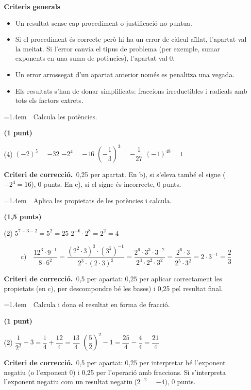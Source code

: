 \documentclass[11pt,a4paper]{article}
\newcounter{preg}
\newcommand{\pregunta}[2]{\par\needspace{6\baselineskip}\bigskip\stepcounter{preg}\noindent
  \parbox[t]{\dimexpr\linewidth-2.6cm\relax}{\hangindent=1.4em\hangafter=1\leavevmode{\color{navy}\bfseries\thepreg.}\ \ #2}\hfill{\small\bfseries\color{cursfosc}(#1)}\par}
\newcommand{\res}[1]{\boxed{#1}}
\newcommand{\criteri}[1]{\par\smallskip
  \begin{tcolorbox}[colback=curs!7,colframe=curs!55,boxrule=0.5pt,arc=1.5mm,left=2.5mm,right=2.5mm,top=1mm,bottom=1mm]
  \footnotesize{\bfseries\color{cursfosc}Criteri de correcció.}\ #1
  \end{tcolorbox}}
\begin{document}
\thispagestyle{primera}

\vspace{8pt}

\begin{tcolorbox}[colback=soft,colframe=soft,arc=2mm,left=3mm,right=3mm,top=1.5mm,bottom=1.5mm]
\small\textbf{Criteris generals}
\begin{itemize}[leftmargin=1.3em,itemsep=1pt,topsep=2pt]
  \item Un resultat sense cap procediment o justificació no puntua.
  \item Si el procediment és correcte però hi ha un error de càlcul aïllat, l'apartat val la meitat. Si l'error canvia el tipus de problema (per exemple, sumar exponents en una suma de potències), l'apartat val 0.
  \item Un error arrossegat d'un apartat anterior només es penalitza una vegada.
  \item Els resultats s'han de donar simplificats: fraccions irreductibles i radicals amb tots els factors extrets.
\end{itemize}
\end{tcolorbox}

\pregunta{1 punt}{Calcula les potències.}
\begin{tasks}(4)
  \task $(-2)^{5}=\res{-32}$
  \task $-2^{4}=\res{-16}$
  \task $\left(-\dfrac13\right)^{3}=\res{-\dfrac{1}{27}}$
  \task $(-1)^{48}=\res{1}$
\end{tasks}
\criteri{0,25 per apartat. En b), si s'eleva també el signe ($-2^{4}=16$), 0 punts. En c), si el signe és incorrecte, 0 punts.}

\pregunta{1,5 punts}{Aplica les propietats de les potències i calcula.}
\begin{tasks}(2)
  \task $5^{7-3-2}=5^{2}=\res{25}$
  \task $2^{-6}\cdot2^{8}=2^{2}=\res{4}$
\end{tasks}
\[\text{c)}\quad \frac{12^{3}\cdot9^{-1}}{8\cdot6^{2}}=\frac{\left(2^{2}\cdot3\right)^{3}\cdot\left(3^{2}\right)^{-1}}{2^{3}\cdot(2\cdot3)^{2}}=\frac{2^{6}\cdot3^{3}\cdot3^{-2}}{2^{3}\cdot2^{2}\cdot3^{2}}=\frac{2^{6}\cdot3}{2^{5}\cdot3^{2}}=2\cdot3^{-1}=\res{\frac{2}{3}}\]
\criteri{0,5 per apartat: 0,25 per aplicar correctament les propietats (en c), per descompondre bé les bases) i 0,25 pel resultat final.}

\pregunta{1 punt}{Calcula i dona el resultat en forma de fracció.}
\begin{tasks}(2)
  \task $\dfrac{1}{2^{2}}+3=\dfrac14+\dfrac{12}{4}=\res{\dfrac{13}{4}}$
  \task $\left(\dfrac52\right)^{2}-1=\dfrac{25}{4}-\dfrac44=\res{\dfrac{21}{4}}$
\end{tasks}
\criteri{0,5 per apartat: 0,25 per interpretar bé l'exponent negatiu (o l'exponent 0) i 0,25 per l'operació amb fraccions. Si s'interpreta l'exponent negatiu com un resultat negatiu ($2^{-2}=-4$), 0 punts.}
\end{document}
